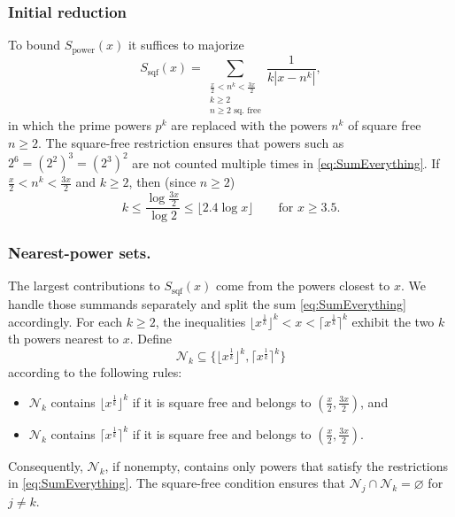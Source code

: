 \documentclass[10pt,reqno]{amsart}
\theoremstyle{plain}
\theoremstyle{definition}
\newcommand{\NN}{\mathcal{N}}
\newcommand{\ceiling}[1]{\lceil #1 \rceil}
\newcommand{\floor}[1]{\lfloor #1 \rfloor}
\begin{document}
\subsubsection{Initial reduction}
To bound $S_{\mathrm{power}}(x)$ it suffices to majorize
\begin{equation}\label{eq:SumEverything}
        S_{\mathrm{sqf}}(x) = \sum_{ \substack{ \frac{x}{2} < n^k <\frac{3x}{2}  \\ k\geq 2 \\ \text{$n \geq 2$ sq.~free} }}  \frac{1}{ k | x-n^k |},
\end{equation}
in which the prime powers $p^k$ are replaced with the powers $n^k$ of square free $n \geq 2$.  
The square-free restriction ensures that powers such as $2^6 = (2^2)^3 = (2^3)^2$ are not counted multiple times in \eqref{eq:SumEverything}. If
$\frac{x}{2} < n^k < \frac{3x}{2}$
and $k \geq 2$, then (since $n \geq 2$)
\begin{equation}\label{eq:BoundK}
k \leq  \frac{\log \frac{3x}{2} }{\log 2}  \leq \floor{2.4 \log x} \qquad \text{for $x \geq 3.5$}.
\end{equation}


\subsubsection{Nearest-power sets.}
The largest contributions to $S_{\mathrm{sqf}}(x)$ come from the powers closest to $x$.
We handle those summands separately and split the sum \eqref{eq:SumEverything} accordingly. 
For each $k \geq 2$, the inequalities
$\floor{ x^{\frac{1}{k}}}^k < x <  \ceiling{ x^{\frac{1}{k}}}^k$
exhibit the two $k$th powers nearest to $x$.  Define
\begin{equation}\label{eq:NNk}
    \NN_k \subseteq \big\{ \floor{ x^{\frac{1}{k}}}^k ,  \ceiling{ x^{\frac{1}{k}}}^k \big\}
\end{equation}
according to the following rules:
\begin{itemize}
    \item $\NN_k$ contains $\floor{ x^{\frac{1}{k}}}^k$ if it is square free and belongs to $( \frac{x}{2}, \frac{3x}{2} )$, and
    \item $\NN_k$ contains $\ceiling{ x^{\frac{1}{k}}}^k$ if it is square free and belongs to $( \frac{x}{2},\frac{3x}{2} )$. 
\end{itemize}
Consequently, $\NN_k$, if nonempty, contains only powers that satisfy the restrictions in \eqref{eq:SumEverything}.
The square-free condition ensures that $\NN_j \cap \NN_k = \varnothing$ for $j \neq k$.
\end{document}
